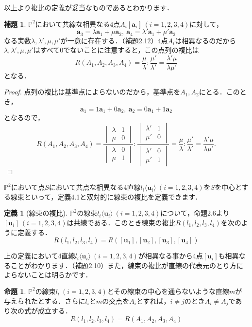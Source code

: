 \documentclass{jsarticle}
\theoremstyle{definition}
\newtheorem{prop}[theorem]{命題}
\newtheorem{lemma}[theorem]{補題}
\newtheorem{definition}[theorem]{定義}
\numberwithin{theorem}{section}
\numberwithin{equation}{section}
\begin{document}
以上より複比の定義が妥当なものであるとわかります．
\begin{lemma}
    $\mathbb{P}^2$において共線な相異なる4点$A_i[\bm{a}_i]\ (i=1,2,3,4)$に対して，
    $$\bm{a}_3=\lambda\bm{a}_1+\mu\bm{a}_2,\ \bm{a}_4=\lambda'\bm{a}_1+\mu'\bm{a}_2$$
    なる実数$\lambda,\lambda',\mu,\mu'$が一意に存在する．（補題2.12）4点$A_i$は相異なるのだから$\lambda,\lambda',\mu,\mu'$はすべて0でないことに注意すると，この点列の複比は
    $$R(A_1,A_2,A_3,A_4)=\frac{\mu}{\lambda}:\frac{\mu'}{\lambda'}=\frac{\lambda'\mu}{\lambda\mu'}$$となる．
\end{lemma}
\begin{proof}
    点列の複比は基準点によらないのだから，基準点を$A_1,A_2$にとる．このとき，
    $$\bm{a}_1=1\bm{a}_1+0\bm{a}_2,\ \bm{a}_2=0\bm{a}_1+1\bm{a}_2$$
    となるので，
    $$R(A_1,A_2,A_3,A_4)=\frac{\begin{vmatrix}
        \lambda & 1 \\
        \mu & 0
    \end{vmatrix}}{\begin{vmatrix}
       \lambda & 0 \\
        \mu & 1 
    \end{vmatrix}}:\frac{\begin{vmatrix}
        \lambda' & 1 \\
        \mu' & 0
    \end{vmatrix}}{\begin{vmatrix}
       \lambda' & 0 \\
        \mu' & 1 
    \end{vmatrix}}=\frac{\mu}{\lambda}:\frac{\mu'}{\lambda'}=\frac{\lambda'\mu}{\lambda\mu'}.$$
\end{proof}
\par $\mathbb{P}^2$において点$S$において共点な相異なる4直線$l_i\langle \bm{u}_i\rangle \ (i=1,2,3,4)$を$S$を中心とする線束といって，定義4.1と双対的に線束の複比を定義できます．
\begin{definition}[線束の複比]
$\mathbb{P}^2$の線束$l_i\langle \bm{u}_i\rangle \ (i=1,2,3,4)$について，命題2.6より$[\bm{u}_i]\ (i=1,2,3,4)$は共線である．このとき線束の複比$R(l_1,l_2,l_3,l_4)$を次のように定義する．
$$R(l_1,l_2,l_3,l_4)=R([\bm{u}_1],[\bm{u}_2],[\bm{u}_3],[\bm{u}_4])$$
\end{definition}
上の定義において4直線$l_i\langle \bm{u}_i\rangle \ (i=1,2,3,4)$が相異なる事から4点$[\bm{u}_i]$も相異なることがわかります．（補題2.10）また，線束の複比が直線の代表元のとり方によらないことは明らかです．
\begin{prop}
    $\mathbb{P}^2$の線束$l_i\ (i=1,2,3,4)$とその線束の中心を通らないような直線$m$が与えられたとする．さらに$l_i$と$m$の交点を$A_i$とすれば，$i\neq j$のとき$A_i\neq A_j$であり次の式が成立する．
    $$R(l_1,l_2,l_3,l_4)=R(A_1,A_2,A_3,A_4)$$
\end{prop}
\end{document}
